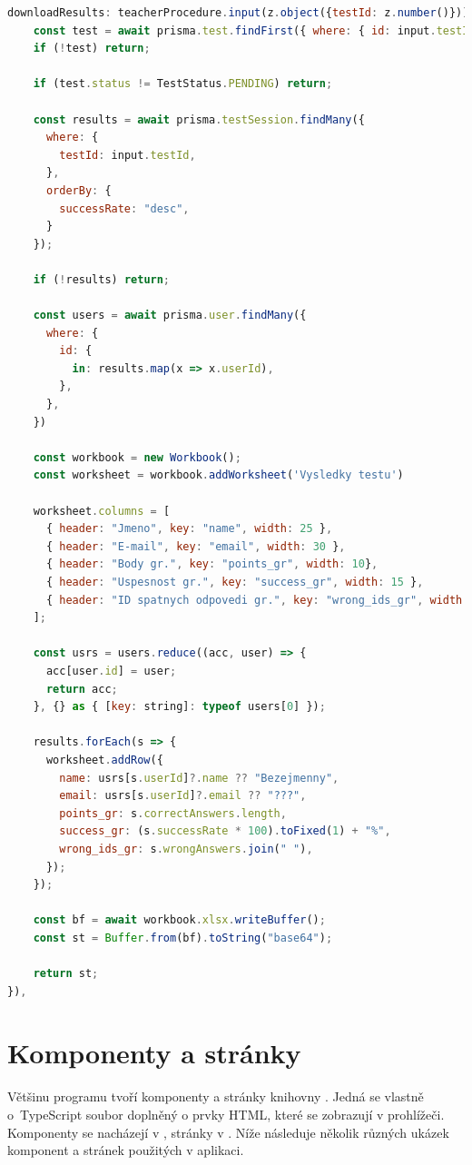 \begin{lstlisting}[language=JavaScript,caption={Endpoint downloadResults}]
downloadResults: teacherProcedure.input(z.object({testId: z.number()})).mutation(async ({ input }) => {
    const test = await prisma.test.findFirst({ where: { id: input.testId }});
    if (!test) return;
    
    if (test.status != TestStatus.PENDING) return;

    const results = await prisma.testSession.findMany({
      where: {
        testId: input.testId,
      }, 
      orderBy: {
        successRate: "desc",
      }
    });

    if (!results) return;

    const users = await prisma.user.findMany({
      where: {
        id: {
          in: results.map(x => x.userId),
        }, 
      },
    })

    const workbook = new Workbook();
    const worksheet = workbook.addWorksheet('Vysledky testu')

    worksheet.columns = [
      { header: "Jmeno", key: "name", width: 25 },
      { header: "E-mail", key: "email", width: 30 },
      { header: "Body gr.", key: "points_gr", width: 10},
      { header: "Uspesnost gr.", key: "success_gr", width: 15 },
      { header: "ID spatnych odpovedi gr.", key: "wrong_ids_gr", width: 40 },
    ];

    const usrs = users.reduce((acc, user) => {
      acc[user.id] = user;
      return acc;
    }, {} as { [key: string]: typeof users[0] });

    results.forEach(s => {
      worksheet.addRow({
        name: usrs[s.userId]?.name ?? "Bezejmenny",
        email: usrs[s.userId]?.email ?? "???",
        points_gr: s.correctAnswers.length,
        success_gr: (s.successRate * 100).toFixed(1) + "%",
        wrong_ids_gr: s.wrongAnswers.join(" "),
      });
    });

    const bf = await workbook.xlsx.writeBuffer();
    const st = Buffer.from(bf).toString("base64");

    return st;
}),
\end{lstlisting}

\newpage
\section{Komponenty a stránky}

Většinu programu tvoří komponenty a stránky knihovny . Jedná se vlastně o~TypeScript soubor doplněný o prvky HTML, které se zobrazují v prohlížeči. Komponenty se nacházejí v , stránky v . Níže následuje několik různých ukázek komponent a stránek použitých v aplikaci. 

